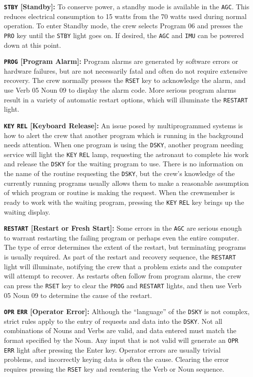 \documentclass[refcap, oxford]{ahsan}
\begin{document}
\textbf{\texttt{STBY} [Standby]:} To conserve power, a standby mode is available in the \texttt{AGC}. This reduces electrical consumption to 15 watts from the 70 watts used during normal operation. To enter Standby mode, the crew selects Program 06 and presses the \texttt{PRO} key until the \texttt{STBY} light goes on. If desired, the \texttt{AGC} and \texttt{IMU} can be powered down at this point.

\textbf{\texttt{PROG} [Program Alarm]:} Program alarms are generated by software errors or hardware failures, but are not necessarily fatal and often do not require extensive recovery. The crew normally presses the \texttt{RSET} key to acknowledge the alarm, and use Verb 05 Noun 09 to display the alarm code. More serious program alarms result in a variety of automatic restart options, which will illuminate the \texttt{RESTART} light.

\textbf{\texttt{KEY} \texttt{REL} [Keyboard Release]:} An issue posed by multiprogrammed systems is how to alert the crew that another program which is running in the background needs attention. When one program is using the \texttt{DSKY}, another program needing service will light the \texttt{KEY} \texttt{REL} lamp, requesting the astronaut to complete his work and release the \texttt{DSKY} for the waiting program to use. There is no information on the name of the routine requesting the \texttt{DSKY}, but the crew's knowledge of the currently running programs usually allows them to make a reasonable assumption of which program or routine is making the request. When the crewmember is ready to work with the waiting program, pressing the \texttt{KEY} \texttt{REL} key brings up the waiting display.

\textbf{\texttt{RESTART} [Restart or Fresh Start]:} Some errors in the \texttt{AGC} are serious enough to warrant restarting the failing program or perhaps even the entire computer. The type of error determines the extent of the restart, but terminating programs is usually required. As part of the restart and recovery sequence, the \texttt{RESTART} light will illuminate, notifying the crew that a problem exists and the computer will attempt to recover. As restarts often follow from program alarms, the crew can press the \texttt{RSET} key to clear the \texttt{PROG} and \texttt{RESTART} lights, and then use Verb 05 Noun 09 to determine the cause of the restart.

\textbf{\texttt{OPR} \texttt{ERR} [Operator Error]:} Although the ``language'' of the \texttt{DSKY} is not complex, strict rules apply to the entry of requests and data into the \texttt{DSKY}. Not all combinations of Nouns and Verbs are valid, and data entered must match the format specified by the Noun. Any input that is not valid will generate an \texttt{OPR} \texttt{ERR} light after pressing the Enter key. Operator errors are usually trivial problems, and incorrectly keying data is often the cause. Clearing the error requires pressing the \texttt{RSET} key and reentering the Verb or Noun sequence.
\end{document}
